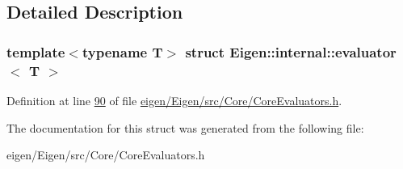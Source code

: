 \subsection{Detailed Description}
\subsubsection*{template$<$typename T$>$\newline
struct Eigen\+::internal\+::evaluator$<$ T $>$}



Definition at line \hyperlink{eigen_2_eigen_2src_2_core_2_core_evaluators_8h_source_l00090}{90} of file \hyperlink{eigen_2_eigen_2src_2_core_2_core_evaluators_8h_source}{eigen/\+Eigen/src/\+Core/\+Core\+Evaluators.\+h}.



The documentation for this struct was generated from the following file\+:\begin{DoxyCompactItemize}
\item 
eigen/\+Eigen/src/\+Core/\+Core\+Evaluators.\+h\end{DoxyCompactItemize}
